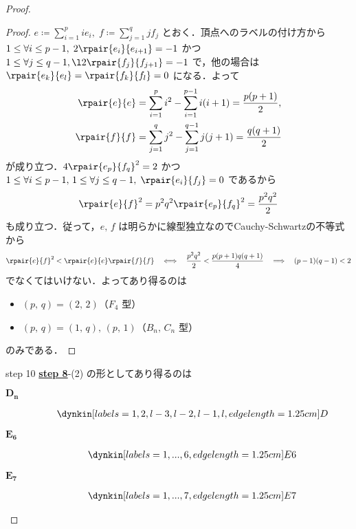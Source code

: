 \documentclass[rep_main]{subfiles}
\begin{document}
\begin{proof}
	\begin{proof}
		$e \coloneqq \sum_{i = 1}^{p} ie_i,\; f \coloneqq \sum_{j=1}^q jf_j$ とおく．頂点へのラベルの付け方から
		$1 \le \forall i \le p-1,\; 2\rpair{e_i}{e_{i+1}} = -1$ かつ $1 \le \forall j \le q-1,\l 2\rpair{f_j}{f_{j+1}} = -1$ で，他の場合は $\rpair{e_k}{e_l} = \rpair{f_k}{f_l} = 0$ になる．よって
		\begin{align}
			\rpair{e}{e} &= \sum_{i=1}^p i^2 - \sum_{i=1}^{p-1} i(i+1) = \frac{p(p+1)}{2},\\
			\rpair{f}{f} &= \sum_{j=1}^q j^2 - \sum_{j=1}^{q-1} j(j+1) = \frac{q(q+1)}{2}
		\end{align}
		が成り立つ．$4\rpair{e_p}{f_q}^2 = 2$ かつ $1 \le \forall i \le p-1,\, 1 \le \forall j \le q-1,\; \rpair{e_i}{f_j} = 0$ であるから
		\begin{align}
			\rpair{e}{f}^2 = p^2q^2 \rpair{e_p}{f_q}^2 = \frac{p^2q^2}{2}
		\end{align}
		も成り立つ．従って，$e,\, f$ は明らかに線型独立なのでCauchy-Schwartzの不等式から
		\begin{align}
			\rpair{e}{f}^2 < \rpair{e}{e}\rpair{f}{f} \IFF \frac{p^2q^2}{2} < \frac{p(p+1)q(q+1)}{4} \IMP (p-1)(q-1) < 2
		\end{align}
		でなくてはいけない．よってあり得るのは
		\begin{itemize}
			\item $(p,\, q) = (2,\, 2)$（$F_4$ 型）
			\item $(p,\, q) = (1,\, q),\, (p,\, 1)$（$B_n,\, C_n$ 型）
		\end{itemize}
		のみである．
	\end{proof}

	\begin{mylem}[label=lem:classification-step-10,breakable]{step 10}
		\hyperref[lem:classification-step-8]{\textsf{\textbf{step 8}}}-(2) の形としてあり得るのは
		\begin{description}
			\item[$\bm{D_n}$] 
			\begin{align}
				\dynkin[%
						labels={1,2,l-3,l-2,l-1,l},
						edge length=1.25cm
					] D{}
			\end{align}

			\item[$\bm{E_6}$] 
			\begin{align}
				\dynkin[%
						labels={1,...,6},
						edge length=1.25cm
					] E6
			\end{align}

			\item[$\bm{E_7}$] 
			\begin{align}
				\dynkin[%
						labels={1,...,7},
						edge length=1.25cm
					] E7
			\end{align}


\end{description}
\end{mylem}
\end{proof}
\end{document}

